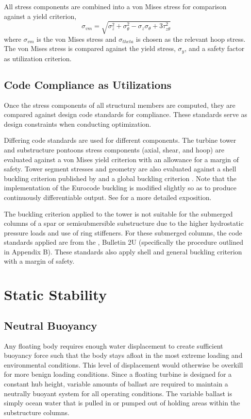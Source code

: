 All stress components are combined into a von Mises stress for
comparison against a yield criterion,
\[
  \sigma_{vm} = \sqrt{\sigma_z^2 + \sigma_{\theta}^2 -
    \sigma_z\sigma_{\theta} + 3\tau_{z\theta}^2}
\]
where $\sigma_{vm}$ is the von Mises stress and $\sigma_{theta}$ is chosen
as the relevant hoop stress.  The von Mises stress is compared against
the yield stress, $\sigma_y$, and a safety factor as utilization criterion.


\subsection{Code Compliance as Utilizations}
Once the stress components of all structural members are computed, they
are compared against design code standards for compliance.
These standards serve as design constraints when conducting optimization.

Differing code standards are used for different components.  The turbine
tower and substructure pontoons stress components (axial, shear, and
hoop) are evaluated against a von Mises yield criterion with an
allowance for a margin of safety.  Tower segment stresses and geometry
are also evaluated against a shell buckling criterion published by
\citet{Eurocode} and a global buckling criterion \citet{Germanischer}.
Note that the implementation of the Eurocode buckling is modified
slightly so as to produce continuously differentiable output.  See
\citet{JacketSE} for a more detailed exposition.

The buckling criterion applied to the tower is not suitable for the
submerged columns of a spar or semisubmersible substructure due to the
higher hydrostatic pressure loads and use of ring stiffeners.  For these
submerged columns, the code standards applied are from the
\citet{api2U}, Bulletin 2U (specifically the procedure outlined in
Appendix B).  These standards also apply shell and general buckling
criterion with a margin of safety.


\section{Static Stability}
\label{sec:static}
\subsection{Neutral Buoyancy}
Any floating body requires enough water displacement to create
sufficient buoyancy force such that the body stays afloat in the most
extreme loading and environmental conditions.  This level of
displacement would otherwise be overkill for more benign loading
conditions.  Since a floating turbine is designed for a constant hub
height, variable amounts of ballast are required to maintain a neutrally
buoyant system for all operating conditions.  The variable ballast is
simply ocean water that is pulled in or pumped out of holding areas
within the substructure columns.

